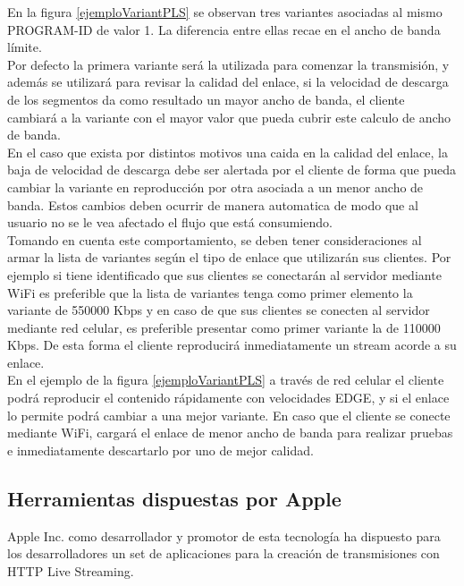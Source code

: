 En la figura \ref{ejemploVariantPLS} se observan tres variantes asociadas al mismo PROGRAM-ID de valor 1. La diferencia entre ellas recae en el ancho de banda límite.\\

Por defecto la primera variante será la utilizada para comenzar la transmisión, y además se utilizará para revisar la calidad del enlace, si la velocidad de descarga de los segmentos da como resultado un mayor ancho de banda, el cliente cambiará a la variante con el mayor valor que pueda cubrir este calculo de ancho de banda.\\

En el caso que exista por distintos motivos una caida en la calidad del enlace, la baja de velocidad de descarga debe ser alertada por el cliente de forma que pueda cambiar la variante en reproducción por otra asociada a un menor ancho de banda. Estos cambios deben ocurrir de manera automatica de modo que al usuario no se le vea afectado el flujo que está consumiendo.\\

Tomando en cuenta este comportamiento, se deben tener consideraciones al armar la lista de variantes según el tipo de enlace que utilizarán sus clientes. Por ejemplo si tiene identificado que sus clientes se conectarán al servidor mediante WiFi es preferible que la lista de variantes tenga como primer elemento la variante de 550000 Kbps y en caso de que sus clientes se conecten al servidor mediante red celular, es preferible presentar como primer variante la de 110000 Kbps.
	De esta forma el cliente reproducirá inmediatamente un stream acorde a su enlace. \\
	
En el ejemplo de la figura \ref{ejemploVariantPLS} a través de red celular el cliente podrá reproducir el contenido rápidamente con velocidades EDGE, y si el enlace lo permite podrá cambiar a una mejor variante. En caso que el cliente se conecte mediante WiFi, cargará el enlace de menor ancho de banda para realizar pruebas e inmediatamente descartarlo por uno de mejor calidad.




	\subsection{Herramientas dispuestas por Apple}
	Apple Inc. como desarrollador y promotor de esta tecnología ha dispuesto para los desarrolladores un set de aplicaciones para la creación de transmisiones con HTTP Live Streaming.
